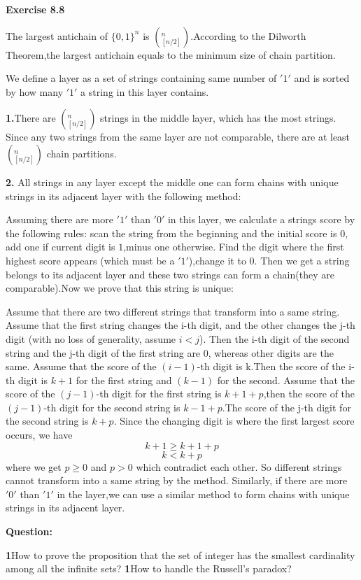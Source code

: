 \documentclass{article} %
\begin{document}
	\textbf{Exercise 8.8}\par
	 The largest antichain of $\{0,1\}^n$ is $(_{[n/2]}^n)$.According to the Dilworth Theorem,the largest antichain equals to the minimum size of chain partition.\par
	 We define a layer as a set of strings containing same number of $'1'$ and is sorted by how many  $'1'$ a string in this layer contains.\par 
	 \textbf{1.}There are $(_{[n/2]}^n)$ strings in the middle layer, which has the most strings. Since any two strings from the same layer are not comparable, there are at least $(_{[n/2]}^n)$ chain partitions.\par
	 \textbf{2.} All strings in any layer except the middle one can form chains with unique strings in its adjacent layer with the following method:\par
	 Assuming there are more $'1'$ than $'0'$ in this layer, we calculate a strings score by the following rules: scan the string from the beginning and the initial score is $0$, add one if current digit is $1$,minus one otherwise. Find the digit where the first highest score appears (which must be a $'1'$),change it to $0$. Then we get a string belongs to its adjacent layer and these two strings can form a chain(they are comparable).Now we prove that this string is unique:\par    
	 Assume that there are two different strings that transform into a same string. Assume that the first string changes the i-th digit, and the other changes the j-th digit (with no loss of generality, assume $i<j$).  Then the i-th digit of the second string and the j-th digit of the first string are $0$, whereas other digits are the same. Assume that the score of the $(i-1)$-th digit is k.Then the score of the i-th digit is $k+1$ for the first string and $(k-1)$ for the second. Assume that the score of the $(j-1)$-th digit for the first string is $k+1+p$,then the score of the $(j-1)$-th digit for the second string is $k-1+p$.The score of the j-th digit for the second string is $k+p$. Since the changing digit is where the first largest score occurs, we have
	 $$
	 k+1 \ge k+1+p
	 $$
	 $$
	 k<k+p
	 $$
	 where we get $p\geq 0$ and $p>0$ which contradict each other. So  different strings cannot transform into a same string by the method. Similarly, if there are more $'0'$ than $'1'$ in the layer,we can use a similar method to form chains with unique strings in its adjacent layer.  
	 
	\textbf{Question:}\par
	\textbf{1}How to prove the proposition that the set of integer has the smallest cardinality among all the infinite sets?
	\textbf{1}How to handle the Russell's paradox? 
	
\end{document}
